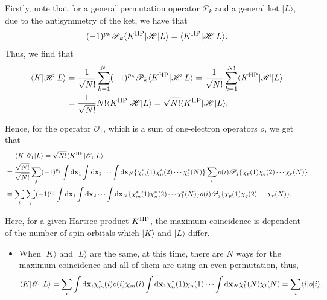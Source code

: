 \documentclass[a4paper]{book}
\newcounter{solution}[chapter]
\newcommand*{\dif}{\mathop{}\!\mathrm{d}}
\newcommand{\bfx}{{\bf x}}
\begin{document}
	\begin{solution}
	
	Firstly, note that for a general permutation operator $\mathscr{P}_k$ and a general ket $| L \rangle$, due to the antisymmetry of the ket, we have that 
	\[
		(-1)^{p_k} \mathscr{P}_k \langle K^{\rm HP} | \mathscr{H} | L \rangle = \langle K^{\rm HP} | \mathscr{H} | L \rangle .
	\]	
	Thus, we find that
	\begin{align*}
		\langle K | \mathscr{H} | L \rangle &= \frac{1}{\sqrt{N!}} \sum_{ k=1 }^{ N! } (-1)^{p_k} \mathscr{P}_k \langle  K^{\rm HP} | \mathscr{H} | L \rangle = \frac{1}{\sqrt{N!}} \sum_{ k=1 }^{ N! } \langle K^{\rm HP} | \mathscr{H} | L \rangle  \\
		&= \frac{1}{\sqrt{N!}} N! \langle K^{\rm HP} | \mathscr{H} | L \rangle = \sqrt{N!} \langle K^{\rm HP} | \mathscr{H} | L \rangle .
	\end{align*}
	
	Hence, for the operator $\mathscr{O}_1$, which is a sum of one-electron operators $o$, we get that
	\begin{align*}
		&\hspace{1.4em}\langle K | \mathscr{O}_1 | L \rangle = \sqrt{N!} \langle K^{\rm HP} | \mathscr{O}_1 | L \rangle \\
		&= \frac{\sqrt{N!}}{ \sqrt{N!} } \sum_j (-1)^{p_j} \int \dif \bfx_1 \int \dif \bfx_2 \cdots \int \dif \bfx_N \{ \chi^*_m(1) \chi^*_n(2) \cdots \chi^*_l(N) \} \sum_i o(i) \mathscr{P}_j \{ \chi_p(1) \chi_q(2) \cdots \chi_r(N) \} \\
		&= \sum_i \sum_j (-1)^{p_j} \int \dif \bfx_1 \int \dif \bfx_2 \cdots \int \dif \bfx_N \{ \chi^*_m(1) \chi^*_n(2) \cdots \chi^*_l(N) \} o(i) \mathscr{P}_j \{ \chi_p(1) \chi_q(2) \cdots \chi_r(N) \} .
	\end{align*}
	
	Here, for a given Hartree product $K^{\rm HP}$, the maximum coincidence is dependent of the number of spin orbitals which $|K\rangle$ and $|L\rangle$ differ.
	\begin{itemize}
		
	\item When $|K\rangle$ and $|L\rangle$ are the same, at this time, there are $N$ ways for the maximum coincidence and all of them are using an even permutation, thus,
	\[
		\langle K | \mathscr{O}_1 | L \rangle = \sum_i \int \dif \bfx_i \chi^*_m(i) o(i) \chi_m(i) \int \dif \bfx_1 \chi^*_n(1) \chi_n(1) \cdots \int \dif \bfx_N \chi^*_l(N) \chi_l(N) = \sum_i \langle i | o | i \rangle .
	\]
	

\end{itemize}
\end{solution}
\end{document}
